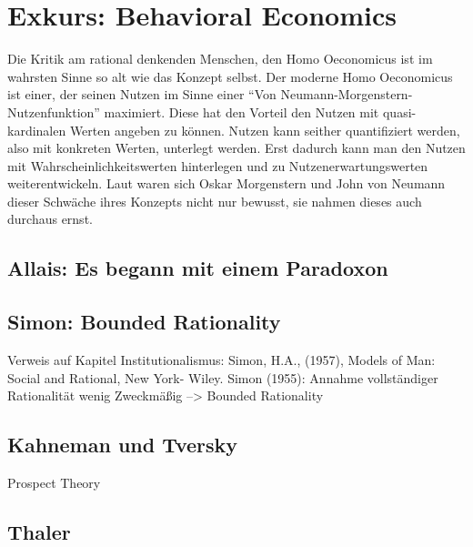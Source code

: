 %
%
%

\chapter{Exkurs: Behavioral Economics}
\label{Behavioral}


Die Kritik am rational denkenden Menschen, den Homo Oeconomicus ist im wahrsten Sinne so alt wie das Konzept selbst. Der moderne Homo Oeconomicus ist einer, der seinen Nutzen im Sinne einer "`Von Neumann-Morgenstern-Nutzenfunktion"' \parencite{VonNeumann1944} maximiert. Diese hat den Vorteil den Nutzen mit quasi-kardinalen Werten angeben zu können. Nutzen kann seither quantifiziert werden, also mit konkreten Werten, unterlegt werden. Erst dadurch kann man den Nutzen mit Wahrscheinlichkeitswerten hinterlegen und zu Nutzenerwartungswerten weiterentwickeln. Laut \textcite[S. 3]{Selten2001} waren sich Oskar Morgenstern und John von Neumann dieser Schwäche ihres Konzepts nicht nur bewusst, sie nahmen dieses auch durchaus ernst.




\section{Allais: Es begann mit einem Paradoxon}

\section{Simon: Bounded Rationality}
Verweis auf Kapitel Institutionalismus: Simon, H.A., (1957), Models of Man: Social and Rational, New York- Wiley.
Simon (1955): Annahme vollständiger Rationalität wenig Zweckmäßig --> Bounded Rationality

\section{Kahneman und Tversky}
Prospect Theory

\section{Thaler}